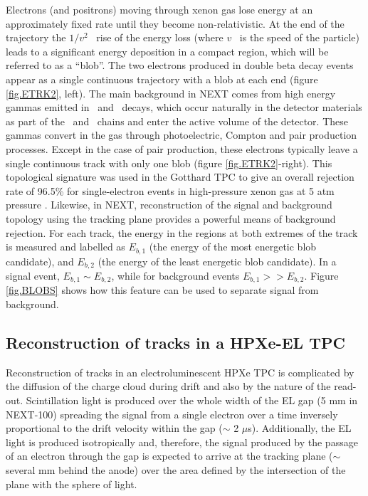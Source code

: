 \documentclass[a4paper,11pt]{article}
\begin{document}
Electrons (and positrons) moving through xenon gas lose energy at an approximately fixed rate until they become non-relativistic. At the end of the trajectory the $1/v^2$~ rise of the energy loss (where $v$~ is the speed of the particle) leads to a significant energy deposition in a compact region, which will be referred to as a ``blob''. The two electrons produced in double beta decay events appear as a single continuous trajectory with a blob at each end (figure \ref{fig.ETRK2}, left). The main background in NEXT comes from high energy gammas emitted in \TL\ and \BI\ decays, which occur naturally in the detector materials as part of the \THT\ and \UTT\ chains and enter the active volume of the detector. These gammas convert in the gas through photoelectric, Compton and pair production processes. Except in the case of pair production, these electrons typically leave a single continuous track with only one blob (figure \ref{fig.ETRK2}-right). This topological signature was used in the Gotthard TPC to give an overall rejection rate of 96.5\% for single-electron events in high-pressure xenon gas at 5 atm pressure \cite{Gotthard_1998}. Likewise, in NEXT, reconstruction of the signal and background topology using the tracking plane provides a powerful means of background rejection. For each track, the energy in the regions at both extremes of the track is measured and labelled as $E_{b,1}$ (the energy of the most energetic blob candidate), and $E_{b,2}$ (the energy of the least energetic blob candidate). In a signal event, $E_{b,1} \sim E_{b,2} $, while for background events $E_{b,1} >> E_{b,2} $. Figure \ref{fig.BLOBS} shows how this feature can be used to separate signal from background.

\subsection{Reconstruction of tracks in a HPXe-EL TPC}\label{ssec.reconstruction}
Reconstruction of tracks in an electroluminescent HPXe TPC is complicated by the diffusion of the charge cloud during drift and also by the nature of the read-out. Scintillation light is produced over the whole width of the EL gap (5 mm in NEXT-100) spreading the signal from a single electron over a time inversely proportional to the drift velocity within the gap ($\sim$ 2 $\mu$s). Additionally, the EL light is produced isotropically and, therefore, the signal produced by the passage of an electron through the gap is expected to arrive at the tracking plane ($\sim$ several mm behind the anode) over the area defined by the intersection of the plane with the sphere of light.
\end{document}
